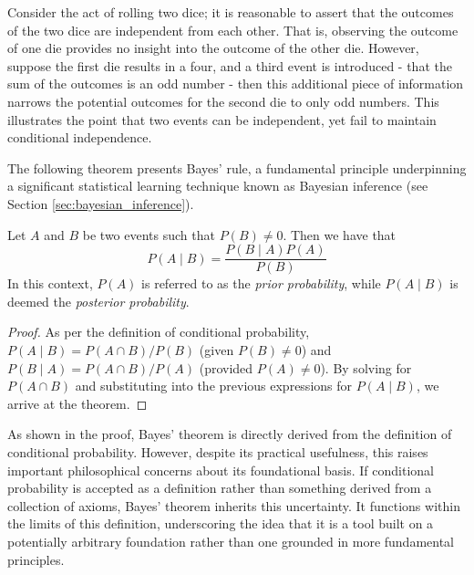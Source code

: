 \begin{example}
Consider the act of rolling two dice; it is reasonable to assert that the outcomes of the two dice are independent from each other. That is, observing the outcome of one die provides no insight into the outcome of the other die. However, suppose the first die results in a four, and a third event is introduced - that the sum of the outcomes is an odd number - then this additional piece of information narrows the potential outcomes for the second die to only odd numbers. This illustrates the point that two events can be independent, yet fail to maintain conditional independence.
\end{example}

The following theorem presents Bayes' rule, a fundamental principle underpinning a significant statistical learning technique known as Bayesian inference (see Section \ref{sec:bayesian_inference}). 

\begin{theorem}\label{th:Bayes_theorem} Let $A$ and $B$ be two events such that $P\left( B \right) \neq 0$. Then we have that
\[
P \left( A \mid B \right) = \frac{P \left( B \mid A \right) P \left( A \right)}{P \left( B \right)}
\]
In this context, $P\left( A \right)$ is referred to as the \emph{prior probability}, while $P\left( A \mid B \right)$ is deemed the \emph{posterior probability}.
\end{theorem}
\begin{proof}
As per the definition of conditional probability, $P \left( A \mid B \right) = P \left( A \cap B \right) / P \left( B \right)$ (given $P \left( B \right) \neq 0$) and $P \left( B \mid A \right) = P \left( A \cap B \right) / P \left( A \right)$ (provided $P \left( A \right) \neq 0$). By solving for $P(A\cap B)$ and substituting into the previous expressions for $P(A\mid B)$, we arrive at the theorem.
\end{proof}

As shown in the proof, Bayes' theorem is directly derived from the definition of conditional probability. However, despite its practical usefulness, this raises important philosophical concerns about its foundational basis. If conditional probability is accepted as a definition rather than something derived from a collection of axioms, Bayes' theorem inherits this uncertainty. It functions within the limits of this definition, underscoring the idea that it is a tool built on a potentially arbitrary foundation rather than one grounded in more fundamental principles.

